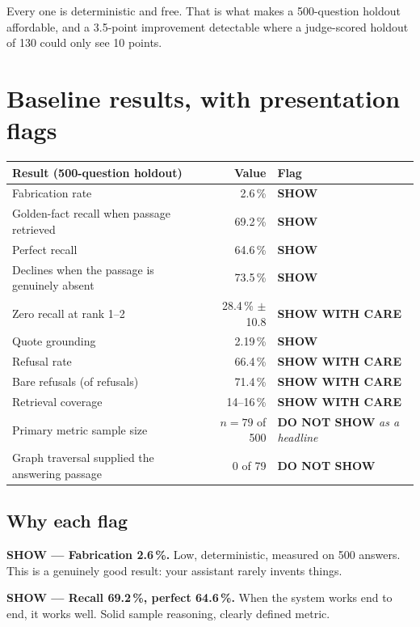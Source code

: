 \documentclass[11pt,a4paper]{article}
\newcommand{\SHOW}{\textcolor{good}{\textbf{SHOW}}}
\newcommand{\HIDE}{\textcolor{bad}{\textbf{DO NOT SHOW}}}
\newcommand{\CARE}{\textcolor{warn}{\textbf{SHOW WITH CARE}}}
\begin{document}
Every one is deterministic and free. That is what makes a 500-question holdout
affordable, and a 3.5-point improvement detectable where a judge-scored holdout of
130 could only see 10 points.

\section{Baseline results, with presentation flags}

\begin{table}[h]\centering\small
\begin{tabularx}{\textwidth}{Y r l}
\toprule
\textbf{Result (500-question holdout)} & \textbf{Value} & \textbf{Flag} \\
\midrule
Fabrication rate & 2.6\,\% & \SHOW \\
 Golden-fact recall when passage retrieved & 69.2\,\% & \SHOW \\
Perfect recall & 64.6\,\% & \SHOW \\
 Declines when the passage is genuinely absent & 73.5\,\% & \SHOW \\
Zero recall at rank 1--2 & 28.4\,\% $\pm$ 10.8 & \CARE \\
 Quote grounding & 2.19\,\% & \SHOW \\
Refusal rate & 66.4\,\% & \CARE \\
 Bare refusals (of refusals) & 71.4\,\% & \CARE \\
Retrieval coverage & 14--16\,\% & \CARE \\
 Primary metric sample size & $n=79$ of 500 & \HIDE{} \emph{as a headline} \\
Graph traversal supplied the answering passage & 0 of 79 & \HIDE \\
\bottomrule
\end{tabularx}
\end{table}

\subsection*{Why each flag}

\textbf{\SHOW{} --- Fabrication 2.6\,\%.} Low, deterministic, measured on 500
answers. This is a genuinely good result: your assistant rarely invents things.

\textbf{\SHOW{} --- Recall 69.2\,\%, perfect 64.6\,\%.} When the system works end to
end, it works well. Solid sample reasoning, clearly defined metric.
\end{document}
